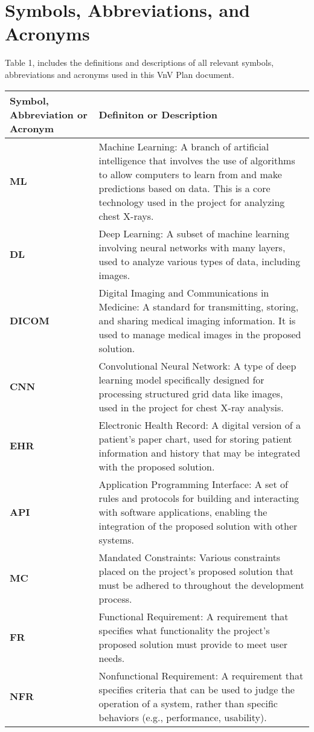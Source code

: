 \documentclass[12pt, titlepage]{article}
\begin{document}
\section{Symbols, Abbreviations, and Acronyms}

Table 1, includes the definitions and descriptions of all relevant symbols,
abbreviations and acronyms used in this VnV Plan document.

\begin{longtable}[c]{|p{}|p{}|}
  \hline
  \textbf{Symbol, Abbreviation or Acronym} & \textbf{Definiton or Description} \\ \hline
  \textbf{ML} & Machine Learning: A branch of artificial intelligence that involves the use of algorithms to allow computers to learn from and make predictions based on data. This is a core technology used in the project for analyzing chest X-rays. \\ \hline
  \textbf{DL} & Deep Learning: A subset of machine learning involving neural networks with many layers, used to analyze various types of data, including images. \\ \hline
  \textbf{DICOM} & Digital Imaging and Communications in Medicine: A standard for transmitting, storing, and sharing medical imaging information. It is used to manage medical images in the proposed solution. \\ \hline
  \textbf{CNN} & Convolutional Neural Network: A type of deep learning model specifically designed for processing structured grid data like images, used in the project for chest X-ray analysis. \\ \hline
  \textbf{EHR} & Electronic Health Record: A digital version of a patient's paper chart, used for storing patient information and history that may be integrated with the proposed solution. \\ \hline
  \textbf{API} & Application Programming Interface: A set of rules and protocols for building and interacting with software applications, enabling the integration of the proposed solution with other systems. \\ \hline
  \textbf{MC} & Mandated Constraints: Various constraints placed on the project’s proposed solution that must be adhered to throughout the development process. \\ \hline
  \textbf{FR} & Functional Requirement: A requirement that specifies what functionality the project’s proposed solution must provide to meet user needs. \\ \hline
  \textbf{NFR} & Nonfunctional Requirement: A requirement that specifies criteria that can be used to judge the operation of a system, rather than specific behaviors (e.g., performance, usability). \\ \hline

\end{longtable}
\end{document}
